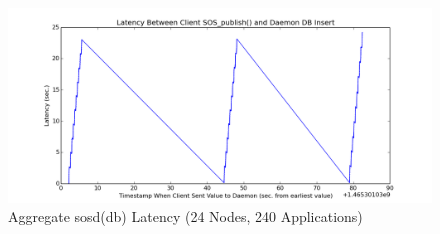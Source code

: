 \begin{figure}[h]
\centering
\includegraphics[width=\columnwidth]{images/aciss_latency_24_agg.png}
\caption{Aggregate sosd(db) Latency (24 Nodes, 240 Applications)}
\label{aciss_lat_24_agg}
\end{figure}
%
\par
%



